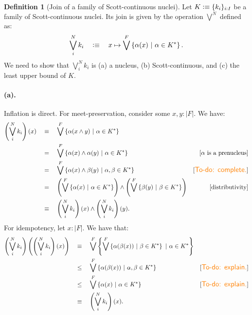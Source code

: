 \documentclass[a4paper, 11pt]{article}
\theoremstyle{definition}
\newtheorem{defn}{Definition}
\newcommand{\paren}[1]{\left( #1 \right)}
\newcommand{\setof}[1]{\left\{ #1 \right\}}
\newcommand{\is}{\vcentcolon\equiv}
\newcommand{\todo}[1]{{\large\color{orange}\textsf{To-do: #1.}}}
\begin{document}
\begin{defn}[Join of a family of Scott-continuous nuclei]
  Let $K \is \{ k_i \}_{i : I}$ be a family of Scott-continuous nuclei. Its join is given by
  the operation $\bigvee^N$ defined as:
  \begin{equation*}
    \bigvee^N_{i} k_i \quad\is\quad x \mapsto \bigvee^F \left\{ \alpha(x) ~|~ \alpha \in K^* \right\}.
  \end{equation*}
  We need to show that $\bigvee^N_{i} k_i$ is
    (a) a nucleus,
    (b) Scott-continuous, and
    (c) the least upper bound of $K$.

  \paragraph{(a).} Inflation is direct. For meet-preservation, consider some $x, y : | F |$. We have:
  \begin{align*}
    \left(\bigvee^N_{i} k_i\right)(x)
    &\quad\equiv\quad \bigvee^F \left\{ \alpha(x \wedge y) ~|~ \alpha \in K^* \right\} \\
    &\quad=\quad \bigvee^F \left\{ \alpha(x) \wedge \alpha(y) ~|~ \alpha \in K^* \right\}
          & [\text{$\alpha$ is a prenucleus}] \\
    &\quad=\quad \bigvee^F \left\{ \alpha(x) \wedge \beta(y) ~|~ \alpha, \beta \in K^* \right\}
          & [\text{\todo{complete}}] \\
    &\quad=\quad \paren{\bigvee^F \setof{ \alpha(x) ~|~ \alpha \in K^* }} \wedge \paren{\bigvee^F \setof{ \beta(y) ~|~ \beta \in K^* }}
          & [\text{distributivity}] \\
    &\quad\equiv\quad \paren{\bigvee^N_i k_i}(x) \wedge \paren{\bigvee^N_i k_i}(y).
  \end{align*}
  For idempotency, let $x : | F |$. We have that:
  \begin{align*}
    \left(\bigvee^N_{i} k_i\right)\left(\left(\bigvee^N_{i} k_i\right)(x)\right)
    &\quad\equiv\quad \bigvee^F \setof{ \bigvee^F \setof{ \alpha(\beta(x)) ~|~ \beta \in K^* } ~|~ \alpha \in K^* } \\
    &\quad\le\quad \bigvee^F \setof{ \alpha(\beta(x)) ~|~ \alpha, \beta \in K^* } & [\text{\todo{explain}}]\\
    &\quad\le\quad \bigvee^F \setof{ \alpha(x) ~|~ \alpha \in K^* } & [\text{\todo{explain}}]\\
    &\quad\equiv\quad \paren{\bigvee^N_i k_i}(x).
  \end{align*}


\end{defn}
\end{document}

